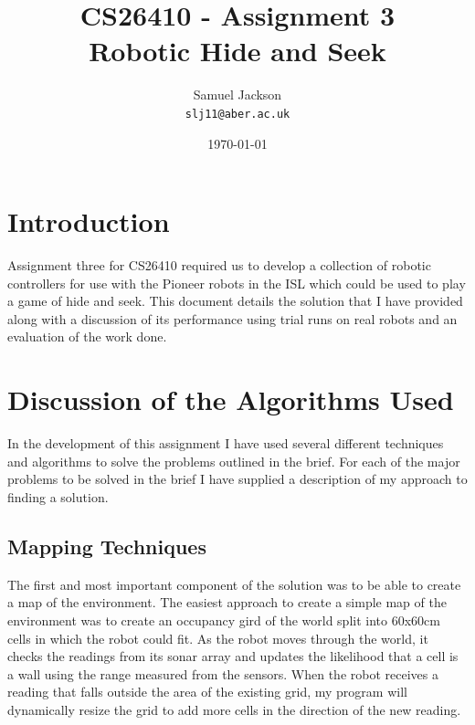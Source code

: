 \documentclass{article}
\begin{document}
\title{CS26410 - Assignment 3 \\ Robotic Hide and Seek}
\author{Samuel Jackson \\ \texttt{slj11@aber.ac.uk}}
\date{\today}
\maketitle

\clearpage
\tableofcontents
\clearpage

\section{Introduction}
Assignment three for CS26410 required us to develop a collection of robotic controllers for use with the Pioneer robots in the ISL which could be used to play a game of hide and seek. This document details the solution that I have provided along with a discussion of its performance using trial runs on real robots and an evaluation of the work done.

\section{Discussion of the Algorithms Used}
In the development of this assignment I have used several different techniques and algorithms to solve the problems outlined in the brief. For each of the major problems to be solved in the brief I have supplied a description of my approach to finding a solution.

\subsection{Mapping Techniques}
The first and most important component of the solution was to be able to create a map of the environment. The easiest approach to create a simple map of the environment was to create an occupancy gird of the world split into 60x60cm cells in which the robot could fit. As the robot moves through the world, it checks the readings from its sonar array and updates the likelihood that a cell is a wall using the range measured from the sensors. When the robot receives a reading that falls outside the area of the existing grid, my program will dynamically resize the grid to add more cells in the direction of the new reading.
\end{document}

